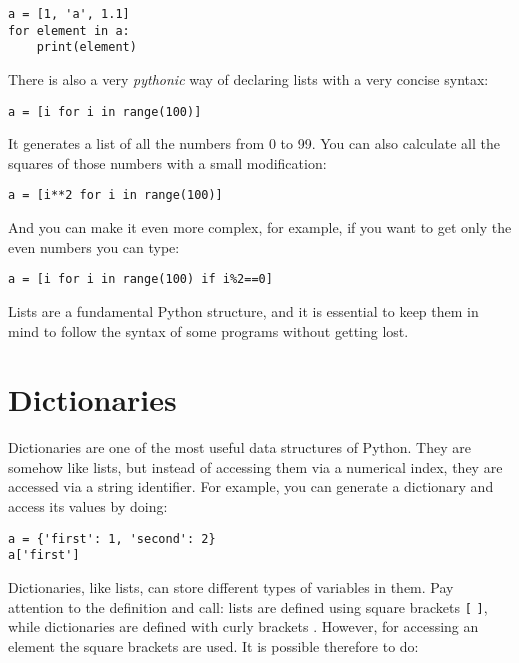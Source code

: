 \begin{verbatim}
a = [1, 'a', 1.1]
for element in a:
    print(element)
\end{verbatim}

There is also a very \emph{pythonic} way of declaring lists with a very concise syntax:

\begin{verbatim}
a = [i for i in range(100)]
\end{verbatim}

It generates a list of all the numbers from 0 to 99. You can also calculate all the squares of those numbers with a small modification:

\begin{verbatim}
a = [i**2 for i in range(100)]
\end{verbatim}

And you can make it even more complex, for example, if you want to get only the even numbers you can type:

\begin{verbatim}
a = [i for i in range(100) if i%2==0]
\end{verbatim}


Lists are a fundamental Python structure, and it is essential to keep them in mind to follow the syntax of some programs without getting lost.

\section{Dictionaries}\label{sec:dictionaries}
Dictionaries are one of the most useful data structures of Python. They are somehow like lists, but instead of accessing them via a numerical index, they are accessed via a string identifier. For example, you can generate a dictionary and access its values by doing:

\begin{verbatim}
a = {'first': 1, 'second': 2}
a['first']
\end{verbatim}

Dictionaries, like lists, can store different types of variables in them. Pay attention to the definition and call: lists are defined using square brackets \texttt{[} \texttt{]}, while dictionaries are defined with curly brackets \texttt{{}}. However, for accessing an element the square brackets are used. It is possible therefore to do:

